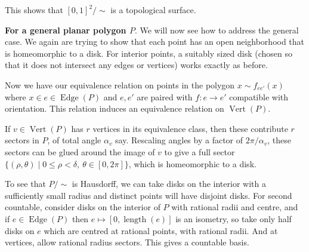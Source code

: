 \documentclass[a4paper]{scrartcl}
\begin{document}
\begin{example}
\begin{center}
\end{center}


This shows that $[0, 1]^2 / \sim$ is a topological surface.

\textbf{For a general planar polygon $P$}. We will now see how to address the general case.
We again are trying to show that each point has an open neighborhood that is homeomorphic to a disk. For interior points, a suitably sized disk (chosen so that it does not intersect any edges or vertices) works exactly as before.

Now we have our equivalence relation on points in the polygon $x \sim f_{ee'}(x)$ where $x \in e \in \operatorname{Edge}(P)$ and $e, e'$ are paired with $f: e \rightarrow e'$ compatible with orientation. This relation induces an equivalence relation on $\operatorname{Vert}(P)$.

If $v \in \operatorname{Vert}(P)$ has $r$ vertices in its equivalence class, then these contribute $r$ sectors in $P$, of total angle $\alpha_v$ say. Rescaling angles by a factor of $2\pi/\alpha_v$, these sectors can be glued around the image of $v$ to give a full sector $\{(\rho, \theta) \mid 0 \leq \rho < \delta,\ \theta \in [0, 2\pi]\}$, which is homeomorphic to a disk.

To see that $P/\sim$ is Hausdorff, we can take disks on the interior with a sufficiently small radius and distinct points will have disjoint disks. For second countable, consider disks on the interior of $P$ with rational radii and centre, and if $e \in \operatorname{Edge}(P)$ then $e \mapsto [0, \operatorname{length}(e)]$ is an isometry, so take only half disks on $e$ which are centred at rational points, with rational radii. And at vertices, allow rational radius sectors. This gives a countable basis.


\end{example}
\end{document}
